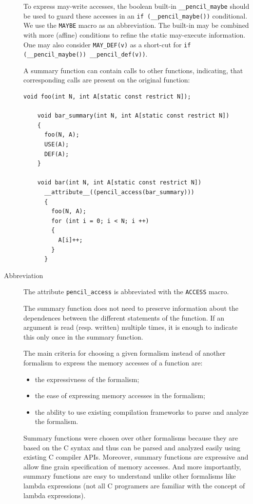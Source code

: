 \documentclass{carp}
\begin{document}
\begin{description}
  To express may-write accesses, the boolean built-in
  \lstinline!__pencil_maybe! should be used to guard these accesses
  in an \lstinline!if (__pencil_maybe())!  conditional. We use the
  \lstinline!MAYBE! macro as an abbreviation. The
  built-in may be combined with more (affine) conditions to refine
  the static may-execute information. One may also consider
  \lstinline!MAY_DEF(v)! as a short-cut for
  \lstinline!if (__pencil_maybe()) __pencil_def(v))!.

  A summary function can contain calls to other functions, indicating,
  that corresponding calls are present on the original function:

  \begin{lstlisting}[language=pencil]
    void foo(int N, int A[static const restrict N]);

    void bar_summary(int N, int A[static const restrict N])
    {
      foo(N, A);
      USE(A);
      DEF(A);
    }

    void bar(int N, int A[static const restrict N])
      __attribute__((pencil_access(bar_summary)))
      {
        foo(N, A);
        for (int i = 0; i < N; i ++)
        {
          A[i]++;
        }
      }
  \end{lstlisting}

  \item[Abbreviation] The attribute \lstinline!pencil_access! is
  abbreviated with the \lstinline!ACCESS! macro.
  
  The summary function does not need to preserve information about
  the dependences between the different statements of the function.
  If an argument is read (resp. written) multiple times, it is enough
  to indicate this only once in the summary function.

  The main criteria for choosing a given formalism instead of another
  formalism to express the memory accesses of a function are:
  \begin{itemize}
   \item the expressivness of the formalism;
   \item the ease of expressing memory accesses in the formalism;
   \item the ability to use existing compilation frameworks to parse
         and analyze the formalism.
  \end{itemize}

  Summary functions were chosen over other formalisms because they are based
  on the C syntax and thus can be parsed and analyzed easily using existing C
  compiler APIs.
  Moreover, summary functions are expressive and allow fine grain
  specification of memory accesses.
  And more importantly, summary functions are easy to understand unlike other
  formalisms like lambda expressions (not all C programers are familiar with
  the concept of lambda expressions).
  

\end{description}
\end{document}
